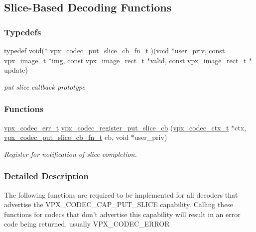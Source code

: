 \hypertarget{group__cap__put__slice}{\subsection{\-Slice-\/\-Based \-Decoding \-Functions}
\label{group__cap__put__slice}
}
\subsubsection*{\-Typedefs}
\begin{DoxyCompactItemize}
\item 
typedef void($\ast$ \hyperlink{group__cap__put__slice_ga344dbbf130aa9632aee94cee1f3cef44}{vpx\-\_\-codec\-\_\-put\-\_\-slice\-\_\-cb\-\_\-fn\-\_\-t} )(void $\ast$user\-\_\-priv, const vpx\-\_\-image\-\_\-t $\ast$img, const vpx\-\_\-image\-\_\-rect\-\_\-t $\ast$valid, const vpx\-\_\-image\-\_\-rect\-\_\-t $\ast$update)
\begin{DoxyCompactList}\small\item\em put slice callback prototype \end{DoxyCompactList}\end{DoxyCompactItemize}
\subsubsection*{\-Functions}
\begin{DoxyCompactItemize}
\item 
\hyperlink{group__codec_gada1084710837ad363b92f2379dd2b8d2}{vpx\-\_\-codec\-\_\-err\-\_\-t} \hyperlink{group__cap__put__slice_gaffcc69a8134406fc653500759b696b8e}{vpx\-\_\-codec\-\_\-register\-\_\-put\-\_\-slice\-\_\-cb} (\hyperlink{group__codec_gad03e2dfa6ae511db7d25be6bbb336233}{vpx\-\_\-codec\-\_\-ctx\-\_\-t} $\ast$ctx, \hyperlink{group__cap__put__slice_ga344dbbf130aa9632aee94cee1f3cef44}{vpx\-\_\-codec\-\_\-put\-\_\-slice\-\_\-cb\-\_\-fn\-\_\-t} cb, void $\ast$user\-\_\-priv)
\begin{DoxyCompactList}\small\item\em \-Register for notification of slice completion. \end{DoxyCompactList}\end{DoxyCompactItemize}


\subsubsection{\-Detailed \-Description}
\-The following functions are required to be implemented for all decoders that advertise the \-V\-P\-X\-\_\-\-C\-O\-D\-E\-C\-\_\-\-C\-A\-P\-\_\-\-P\-U\-T\-\_\-\-S\-L\-I\-C\-E capability. \-Calling these functions for codecs that don't advertise this capability will result in an error code being returned, usually \-V\-P\-X\-\_\-\-C\-O\-D\-E\-C\-\_\-\-E\-R\-R\-O\-R 

